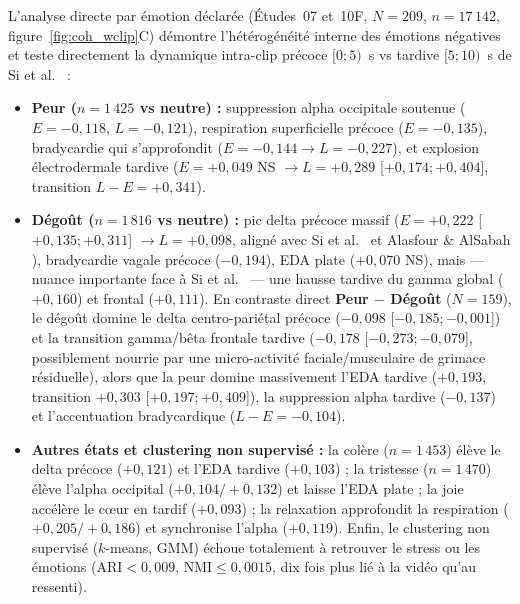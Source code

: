 \documentclass[10pt]{article}
\begin{document}
L'analyse directe par émotion déclarée (Études~07 et~10F, $N = 209$, $n = 17\,142$, figure~\ref{fig:coh_wclip}C) démontre l'hétérogénéité interne des émotions négatives \cite{qin2023,siegel2018,collet1997} et teste directement la dynamique intra-clip précoce $[0 ; 5)$~s vs tardive $[5 ; 10)$~s de Si et al.\ \cite{si2026} :
\begin{itemize}
\item \textbf{Peur ($n = 1\,425$ vs neutre) :} suppression alpha occipitale soutenue ($E = -0{,}118$, $L = -0{,}121$), respiration superficielle précoce ($E = -0{,}135$), bradycardie qui s'approfondit ($E = -0{,}144 \to L = -0{,}227$), et explosion électrodermale tardive ($E = +0{,}049$ NS $\to L = +0{,}289$ [$+0{,}174 ; +0{,}404$], transition $L - E = +0{,}341$).
\item \textbf{Dégoût ($n = 1\,816$ vs neutre) :} pic delta précoce massif ($E = +0{,}222$ [$+0{,}135 ; +0{,}311$] $\to L = +0{,}098$, aligné avec Si et al.\ \cite{si2026} et Alasfour \& AlSabah \cite{alasfour2025}), bradycardie vagale précoce ($-0{,}194$), EDA plate ($+0{,}070$ NS), mais — nuance importante face à Si et al.\ \cite{si2026} — une hausse tardive du gamma global ($+0{,}160$) et frontal ($+0{,}111$). En contraste direct \textbf{Peur $-$ Dégoût} ($N = 159$), le dégoût domine le delta centro-pariétal précoce ($-0{,}098$ [$-0{,}185 ; -0{,}001$]) et la transition gamma/bêta frontale tardive ($-0{,}178$ [$-0{,}273 ; -0{,}079$], possiblement nourrie par une micro-activité faciale/musculaire de grimace résiduelle), alors que la peur domine massivement l'EDA tardive ($+0{,}193$, transition $+0{,}303$ [$+0{,}197 ; +0{,}409$]), la suppression alpha tardive ($-0{,}137$) et l'accentuation bradycardique ($L - E = -0{,}104$).
\item \textbf{Autres états et clustering non supervisé :} la colère ($n = 1\,453$) élève le delta précoce ($+0{,}121$) et l'EDA tardive ($+0{,}103$) ; la tristesse ($n = 1\,470$) élève l'alpha occipital ($+0{,}104 / +0{,}132$) et laisse l'EDA plate ; la joie accélère le cœur en tardif ($+0{,}093$) ; la relaxation approfondit la respiration ($+0{,}205 / +0{,}186$) et synchronise l'alpha ($+0{,}119$). Enfin, le clustering non supervisé ($k$-means, GMM) échoue totalement à retrouver le stress ou les émotions ($\mathrm{ARI} < 0{,}009$, $\mathrm{NMI} \le 0{,}0015$, dix fois plus lié à la vidéo qu'au ressenti).
\end{itemize}
\end{document}
